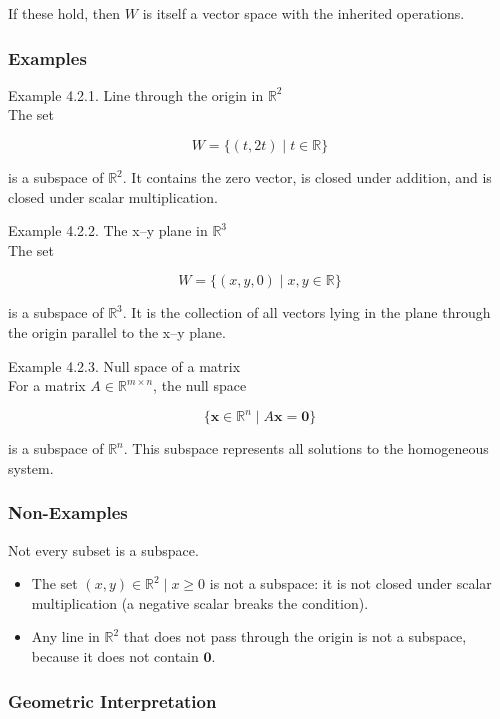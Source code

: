 \documentclass[
  12pt,
  a4paper,
]{article}
\begin{document}
If these hold, then \(W\) is itself a vector space with the inherited
operations.

\subsubsection{Examples}\label{examples-3}

Example 4.2.1. Line through the origin in \(\mathbb{R}^2\)\\
The set

\[W = \{ (t, 2t) \mid t \in \mathbb{R} \}\]

is a subspace of \(\mathbb{R}^2\). It contains the zero vector, is
closed under addition, and is closed under scalar multiplication.

Example 4.2.2. The x--y plane in \(\mathbb{R}^3\)\\
The set

\[W = \{ (x, y, 0) \mid x,y \in \mathbb{R} \}\]

is a subspace of \(\mathbb{R}^3\). It is the collection of all vectors
lying in the plane through the origin parallel to the x--y plane.

Example 4.2.3. Null space of a matrix\\
For a matrix \(A \in \mathbb{R}^{m \times n}\), the null space

\[\{ \mathbf{x} \in \mathbb{R}^n \mid A\mathbf{x} = \mathbf{0} \}\]

is a subspace of \(\mathbb{R}^n\). This subspace represents all
solutions to the homogeneous system.

\subsubsection{Non-Examples}\label{non-examples-2}

Not every subset is a subspace.

\begin{itemize}
\item
  The set \({ (x,y) \in \mathbb{R}^2 \mid x \geq 0 }\) is not a
  subspace: it is not closed under scalar multiplication (a negative
  scalar breaks the condition).
\item
  Any line in \(\mathbb{R}^2\) that does not pass through the origin is
  not a subspace, because it does not contain \(\mathbf{0}\).
\end{itemize}

\subsubsection{Geometric
Interpretation}\label{geometric-interpretation-5}
\end{document}
